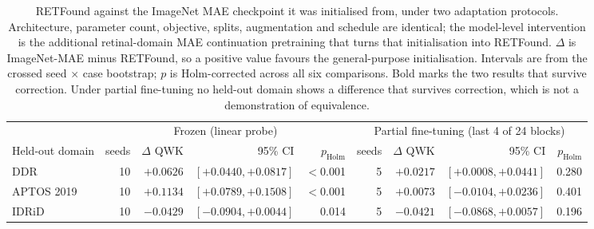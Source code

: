 \begin{table}[t]
\centering
\caption{RETFound against the ImageNet MAE checkpoint it was initialised from, under two adaptation protocols. Architecture, parameter count, objective, splits, augmentation and schedule are identical; the model-level intervention is the additional retinal-domain MAE continuation pretraining that turns that initialisation into RETFound. $\Delta$ is ImageNet-MAE minus RETFound, so a positive value favours the general-purpose initialisation. Intervals are from the crossed seed $\times$ case bootstrap; $p$ is Holm-corrected across all six comparisons. Bold marks the two results that survive correction. Under partial fine-tuning no held-out domain shows a difference that survives correction, which is not a demonstration of equivalence.}
\label{tab:foundation}
\begin{tabular}{lrrrrrrrr}
\toprule
& \multicolumn{4}{c}{Frozen (linear probe)} & \multicolumn{4}{c}{Partial fine-tuning (last 4 of 24 blocks)} \\
\cmidrule(lr){2-5}\cmidrule(lr){6-9}
Held-out domain & seeds & $\Delta$ QWK & 95\% CI & $p_{\text{Holm}}$ & seeds & $\Delta$ QWK & 95\% CI & $p_{\text{Holm}}$ \\
\midrule
DDR & 10 & $\mathbf{+0.0626}$ & $[+0.0440, +0.0817]$ & $<$0.001 & 5 & $+0.0217$ & $[+0.0008, +0.0441]$ & 0.280 \\
APTOS 2019 & 10 & $\mathbf{+0.1134}$ & $[+0.0789, +0.1508]$ & $<$0.001 & 5 & $+0.0073$ & $[-0.0104, +0.0236]$ & 0.401 \\
IDRiD & 10 & $-0.0429$ & $[-0.0904, +0.0044]$ & 0.014 & 5 & $-0.0421$ & $[-0.0868, +0.0057]$ & 0.196 \\
\bottomrule
\end{tabular}
\end{table}
